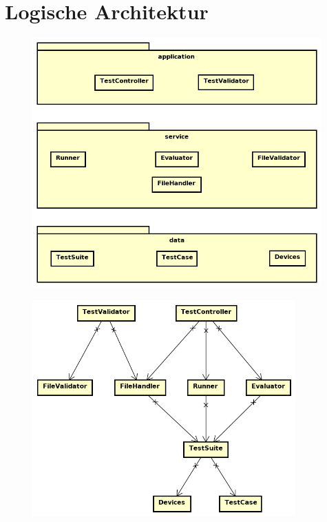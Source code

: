\documentclass[a4,12pt]{scrartcl}
\begin{document}
\section{Logische Architektur}
\begin{figure} [H]
	\begin{center}
	\includegraphics[width=0.99\textwidth]{./pictures/architektur.png}
	\label{Bild Referenz}
	\end{center}
\end{figure}
\begin{figure} [H]
	\begin{center}
	\includegraphics[width=0.90\textwidth]{./pictures/dependence_diagram.png}
	\label{Bild Referenz}
	\end{center}
\end{figure}
\end{document}
